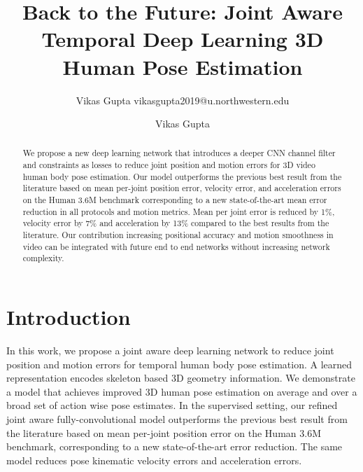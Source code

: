 \documentclass[runningheads]{llncs}
\begin{document}
\pagestyle{headings}
\mainmatter
\def\ECCVSubNumber{1225}  

\title{Back to the Future: Joint Aware Temporal Deep Learning 3D Human Pose Estimation}

\author{Vikas Gupta vikasgupta2019@u.northwestern.edu}


\author{Vikas Gupta} 
\maketitle

\begin{abstract}
We propose a new deep learning network that introduces a deeper CNN channel filter and constraints as losses to reduce joint position and motion errors for 3D video human body pose estimation.  
Our model outperforms the previous best result from the literature based on mean per-joint position error, velocity error, and acceleration errors on the Human 3.6M  benchmark corresponding to a new state-of-the-art mean error reduction in all protocols and motion metrics. Mean per joint error is reduced by 1\%, velocity error by 7\%  and acceleration by 13\% compared to the best results from the literature. Our contribution increasing positional accuracy and motion smoothness in video can be integrated with future end to end networks without increasing network complexity. 



\end{abstract}


\section{Introduction}

In this work, we propose a joint aware deep learning network to reduce joint position and motion errors for temporal human body pose estimation. A learned representation encodes skeleton based 3D geometry information. We demonstrate a model that achieves improved 3D human pose estimation on average and over a broad set of action wise pose estimates.  
In the supervised setting, our refined joint aware fully-convolutional model outperforms the previous best result from the literature based on mean per-joint position error on the Human 3.6M benchmark, corresponding to a new state-of-the-art error reduction. The same model reduces pose kinematic velocity errors and acceleration errors.\\
\end{document}
